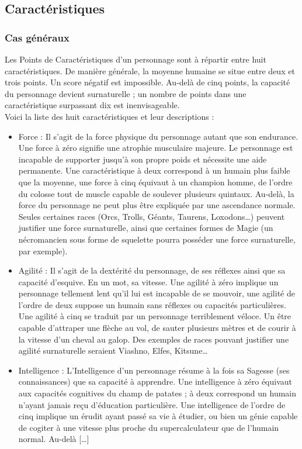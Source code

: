 \subsection{Caractéristiques}
\subsubsection{Cas généraux}
Les Points de Caractéristiques d’un personnage sont à répartir entre huit caractéristiques. De manière générale, la moyenne humaine se situe entre deux et trois points. Un score négatif est impossible. Au-delà de cinq points, la capacité du personnage devient surnaturelle ; un nombre de points dans une caractéristique surpassant dix est inenvisageable.\\
Voici la liste des huit caractéristiques et leur descriptions :
\begin{itemize}
\item{Force :} Il s’agit de la force physique du personnage autant que son endurance. Une force à zéro signifie une atrophie musculaire majeure. Le personnage est incapable de supporter jusqu’à son propre poids et nécessite une aide permanente. Une caractéristique à deux correspond à un humain plus faible que la moyenne, une force à cinq équivaut à un champion homme, de l’ordre du colosse tout de muscle capable de soulever plusieurs quintaux. Au-delà, la force du personnage ne peut plus être expliquée par une ascendance normale. Seules certaines races (Orcs, Trolls, Géants, Taurens, Loxodons…) peuvent justifier une force surnaturelle, ainsi que certaines formes de Magie (un nécromancien sous forme de squelette pourra posséder une force surnaturelle, par exemple).
\item{Agilité :} Il s’agit de la dextérité du personnage, de ses réflexes ainsi que sa capacité d’esquive. En un mot, sa vitesse. Une agilité à zéro implique un personnage tellement lent qu’il lui est incapable de se mouvoir, une agilité de l’ordre de deux suppose un humain sans réflexes ou capacités particulières. Une agilité à cinq se traduit par un personnage terriblement véloce. Un être capable d’attraper une flèche au vol, de sauter plusieurs mètres et de courir à la vitesse d’un cheval au galop. Des exemples de races pouvant justifier une agilité surnaturelle seraient Viashno, Elfes, Kitsune…
\item{Intelligence :} L’Intelligence d’un personnage résume à la fois sa Sagesse (ses connaissances) que sa capacité à apprendre. Une intelligence à zéro équivaut aux capacités cognitives du champ de patates ; à deux correspond un humain n’ayant jamais reçu d’éducation particulière. Une intelligence de l’ordre de cinq implique un érudit ayant passé sa vie à étudier, ou bien un génie capable de cogiter à une vitesse plus proche du supercalculateur que de l’humain normal. Au-delà […]

\end{itemize}
